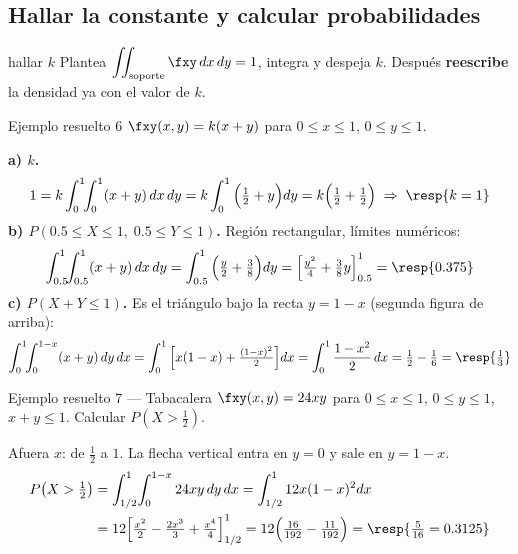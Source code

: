 \subsection{Hallar la constante y calcular probabilidades}

\begin{receta}{hallar $k$}
Plantea $\displaystyle\iint_{\text{soporte}} \fxy\,dx\,dy=1$, integra y despeja $k$. Despu\'es \textbf{reescribe} la densidad ya con el valor de $k$.
\end{receta}

\begin{ejemplo}{Ejemplo resuelto 6 }
$\fxy(x,y)=k(x+y)$ para $0\le x\le1$, $0\le y\le1$.

\textbf{a) $k$.}
\[
1=k\int_0^1\!\!\int_0^1 (x+y)\,dx\,dy=k\int_0^1\Big(\tfrac12+y\Big)dy=k\Big(\tfrac12+\tfrac12\Big)\;\Rightarrow\;\resp{k=1}
\]
\textbf{b) $P(0.5\le X\le1,\;0.5\le Y\le1)$.} Regi\'on rectangular, l\'imites num\'ericos:
\[
\int_{0.5}^1\!\!\int_{0.5}^1 (x+y)\,dx\,dy=\int_{0.5}^1\Big(\tfrac{y}{2}+\tfrac38\Big)dy=\Big[\tfrac{y^2}{4}+\tfrac38y\Big]_{0.5}^{1}=\resp{0.375}
\]
\textbf{c) $P(X+Y\le1)$.} Es el tri\'angulo bajo la recta $y=1-x$ (segunda figura de arriba):
\[
\int_0^1\!\!\int_0^{1-x}(x+y)\,dy\,dx=\int_0^1\Big[x(1-x)+\tfrac{(1-x)^2}{2}\Big]dx=\int_0^1\frac{1-x^2}{2}\,dx=\tfrac12-\tfrac16=\resp{\tfrac13}
\]
\end{ejemplo}

\begin{ejemplo}{Ejemplo resuelto 7 --- Tabacalera }
$\fxy(x,y)=24xy$ para $0\le x\le1$, $0\le y\le1$, $x+y\le1$. Calcular $P(X>\tfrac12)$.

\begin{minipage}{0.29\textwidth}
\end{minipage}
\begin{minipage}{0.69\textwidth}\small
Afuera $x$: de $\tfrac12$ a $1$. La flecha vertical entra en $y=0$ y sale en $y=1-x$.
\begin{align*}
P\big(X>\tfrac12\big)&=\int_{1/2}^{1}\!\int_0^{1-x}24xy\,dy\,dx=\int_{1/2}^{1}12x(1-x)^2dx\\
&=12\Big[\tfrac{x^2}{2}-\tfrac{2x^3}{3}+\tfrac{x^4}{4}\Big]_{1/2}^{1}
=12\Big(\tfrac{16}{192}-\tfrac{11}{192}\Big)=\resp{\tfrac{5}{16}=0.3125}
\end{align*}
\end{minipage}
\end{ejemplo}

